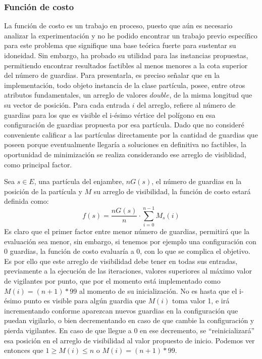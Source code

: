 \documentclass[12pt]{article}
\begin{document}
\subsubsection*{Función de costo}
La función de costo es un trabajo en proceso, puesto que aún es necesario analizar la experimentación
y no he podido encontrar un trabajo previo específico para este problema que signifique una base teórica fuerte para sustentar su idoneidad. Sin embargo, ha probado su utilidad para las instancias propuestas, permitiendo encontrar resultados factibles al menos menores a la cota superior del número de guardias.
Para presentarla, es preciso señalar que en la implementación, todo objeto instancia de la clase partícula, posee, entre otros atributos fundamentales, un arreglo de valores $double$, de la misma longitud que su vector de posición. Para cada entrada $i$ del arreglo, refiere al número de guardias para los que es visible el i-ésimo vértice del polígono en esa configuración de guardias propuesta por esa partícula. Dado que no consideré conveniente calificar a las
partículas directamente por la cantidad de guardias que poseen porque eventualmente llegaría a soluciones en definitiva no factibles, la oportunidad de minimización se realiza considerando ese arreglo de visiblidad, como principal factor.

Sea $s \in E$, una partícula del enjambre, $nG(s)$, el número de guardias en la posición de
la partícula y $M$ su arreglo de visibilidad, la función de costo estará definida como:
\begin{equation}
  f(s) = \frac{nG(s)}{n} \cdot \sum_{i = 0}^{n-1} M_s(i) 
\end{equation}
Es claro que el primer factor entre menor número de guardias, permitirá que la evaluación sea menor,
sin embargo, si tenemos por ejemplo una configuración con 0 guardias, la función de costo evaluaría
a 0, con lo que se complica el objetivo. Es por ello que este arreglo de visibilidad debe tener en todas sus entradas, previamente a la ejecución de las iteraciones, valores superiores al máximo valor de
vigilantes por punto, que por el momento está implementado como $M(i) = (n+1)*99$ al momento de su
inicialización. No es hasta que el i-ésimo punto es visible para algún guardia que $M(i)$ toma valor 1,
e irá incrementando conforme aparezcan nuevos guardias en la configuración que puedan vigilarlo, o bien
decrementando en caso de que cambie la configuración y pierda vigilantes. En caso de que llegue a 0
en ese decremento, se ``reinicializará'' esa posición en el arreglo de visibilidad al valor propuesto de inicio. Podemos ver entonces que $1 \geq M(i) \leq n$ o $M(i) = (n+1)*99$.
\end{document}
